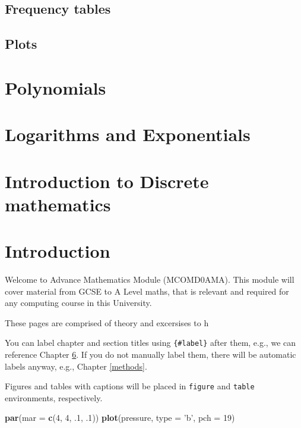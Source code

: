 \documentclass[
]{book}
\newenvironment{Shaded}{\begin{snugshade}}{\end{snugshade}}
\newcommand{\DataTypeTok}[1]{\textcolor[rgb]{0.13,0.29,0.53}{#1}}
\newcommand{\DecValTok}[1]{\textcolor[rgb]{0.00,0.00,0.81}{#1}}
\newcommand{\FloatTok}[1]{\textcolor[rgb]{0.00,0.00,0.81}{#1}}
\newcommand{\KeywordTok}[1]{\textcolor[rgb]{0.13,0.29,0.53}{\textbf{#1}}}
\newcommand{\NormalTok}[1]{#1}
\newcommand{\StringTok}[1]{\textcolor[rgb]{0.31,0.60,0.02}{#1}}
\begin{document}
\hypertarget{frequency-tables}{%
\section{Frequency tables}\label{frequency-tables}}

\hypertarget{plots}{%
\section{Plots}\label{plots}}

\hypertarget{polynomials-1}{%
\chapter{Polynomials}\label{polynomials-1}}

\hypertarget{logarithms-and-exponentials}{%
\chapter{Logarithms and Exponentials}\label{logarithms-and-exponentials}}

\hypertarget{introduction-to-discrete-mathematics}{%
\chapter{Introduction to Discrete mathematics}\label{introduction-to-discrete-mathematics}}

\hypertarget{intro}{%
\chapter{Introduction}\label{intro}}

Welcome to Advance Mathematics Module (MCOMD0AMA). This module will cover material from GCSE to A Level maths, that is relevant and required for any computing course in this University.

These pages are comprised of theory and excersises to h

You can label chapter and section titles using \texttt{\{\#label\}} after them, e.g., we can reference Chapter \ref{intro}. If you do not manually label them, there will be automatic labels anyway, e.g., Chapter \ref{methods}.

Figures and tables with captions will be placed in \texttt{figure} and \texttt{table} environments, respectively.

\begin{Shaded}
\begin{Highlighting}[]
\KeywordTok{par}\NormalTok{(}\DataTypeTok{mar =} \KeywordTok{c}\NormalTok{(}\DecValTok{4}\NormalTok{, }\DecValTok{4}\NormalTok{, }\FloatTok{.1}\NormalTok{, }\FloatTok{.1}\NormalTok{))}
\KeywordTok{plot}\NormalTok{(pressure, }\DataTypeTok{type =} \StringTok{'b'}\NormalTok{, }\DataTypeTok{pch =} \DecValTok{19}\NormalTok{)}
\end{Highlighting}
\end{Shaded}
\end{document}
